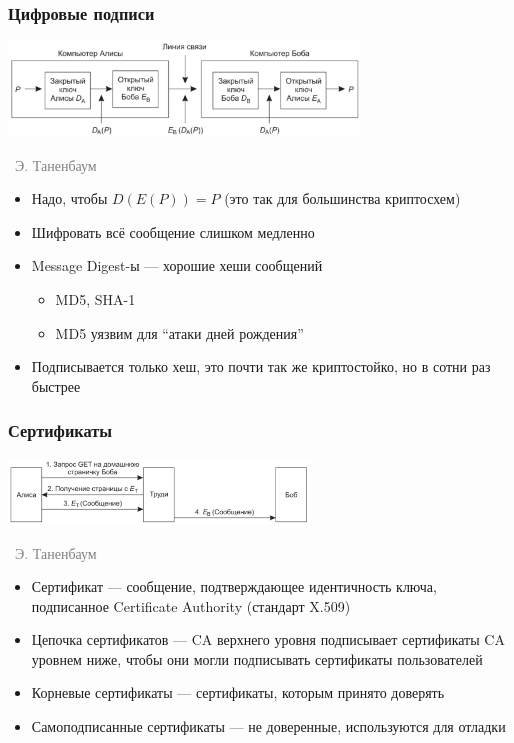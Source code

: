 \documentclass[xetex,mathserif,serif]{beamer}
\newcommand{\attribution}[1] {
\vspace{-5mm}\begin{flushright}\begin{scriptsize}\textcolor{gray}{\textcopyright\, #1}\end{scriptsize}\end{flushright}
}
\begin{document}
	\begin{frame}
		\frametitle{Цифровые подписи}
		\begin{center}
			\includegraphics[width=0.7\textwidth]{signature.png}
			\attribution{Э. Таненбаум}
		\end{center}
		\begin{itemize}
			\item Надо, чтобы $D(E(P)) = P$ (это так для большинства криптосхем)
			\item Шифровать всё сообщение слишком медленно
			\item Message Digest-ы --- хорошие хеши сообщений
			\begin{itemize}
				\item MD5, SHA-1
				\item MD5 уязвим для ``атаки дней рождения''
			\end{itemize}
			\item Подписывается только хеш, это почти так же криптостойко, но в сотни раз быстрее
		\end{itemize}
	\end{frame}

	\begin{frame}
		\frametitle{Сертификаты}
		\begin{center}
			\includegraphics[width=0.6\textwidth]{manInTheMiddle.png}
			\attribution{Э. Таненбаум}
		\end{center}
		\begin{itemize}
			\item Сертификат --- сообщение, подтверждающее идентичность ключа, подписанное Certificate Authority (стандарт X.509)
			\item Цепочка сертификатов --- CA верхнего уровня подписывает сертификаты CA уровнем ниже, чтобы они могли подписывать сертификаты пользователей
			\item Корневые сертификаты --- сертификаты, которым принято доверять
			\item Самоподписанные сертификаты --- не доверенные, используются для отладки
		\end{itemize}
	\end{frame}
\end{document}
